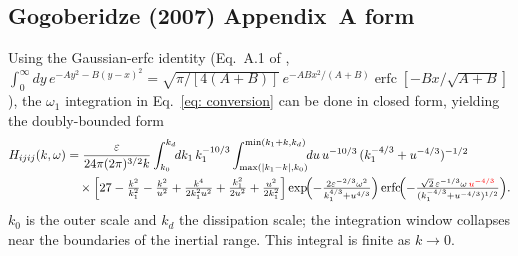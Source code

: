 \documentclass[10pt,prd,aps,nobibnotes,superscriptaddress,preprintnumbers,notitlepage]{revtex4-1}
\newcommand{\add}[1]{{\color{red}#1}}
\newcommand{\add}[1]{#1}
\begin{document}
\subsection{Gogoberidze (2007) Appendix~A form}

Using the Gaussian-erfc identity (Eq.~A.1 of \cite{Gogoberidze:2007an}, $\int_0^\infty dy\,e^{-Ay^2-B(y-x)^2}=\sqrt{\pi/[4(A+B)]}\,e^{-ABx^2/(A+B)}\operatorname{erfc}[-Bx/\sqrt{A+B}]$), the $\omega_1$ integration in Eq.~\eqref{eq: conversion} can be done in closed form, yielding the doubly-bounded form
\begin{align}
  H_{ijij}(k,\omega) &= \frac{\varepsilon}{24\pi(2\pi)^{3/2} k}
  \int_{k_0}^{k_d}\!\!dk_1\,k_1^{-10/3}
  \int_{\max(|k_1-k|,k_0)}^{\min(k_1+k,k_d)}\!\!du\,u^{-10/3}\,(k_1^{-4/3}+u^{-4/3})^{-1/2}\nonumber\\
  &\quad\times\Bigl[27-\tfrac{k^2}{k_1^2}-\tfrac{k^2}{u^2}+\tfrac{k^4}{2k_1^2u^2}+\tfrac{k_1^2}{2u^2}+\tfrac{u^2}{2k_1^2}\Bigr]
  \exp\!\Bigl(-\tfrac{2\varepsilon^{-2/3}\omega^2}{k_1^{4/3}+u^{4/3}}\Bigr)
  \operatorname{erfc}\!\Bigl(-\tfrac{\sqrt{2}\,\varepsilon^{-1/3}\omega\,
  \add{u^{-4/3}}}{(k_1^{-4/3}+u^{-4/3})^{1/2}}\Bigr).
  \label{eq:Hijij-AppA}
\end{align}
$k_0$ is the outer scale and $k_d$ the dissipation scale; the integration window collapses near the boundaries of the inertial range. This integral is finite as $k\to 0$.
\end{document}
